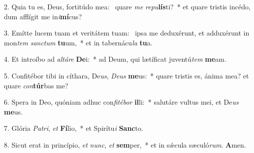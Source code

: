2. Quia tu es, Deus, fortitúdo mea: \dag\  quare \textit{me} \textit{re}\textit{pu}\textbf{lís}ti?~*  et quare tristis incédo, dum afflígit me in\textit{i}\textbf{mí}cus?\

3. Emítte lucem tuam et veritátem tuam: \dag\  ipsa me deduxérunt, et adduxérunt in mon\textit{tem} \textit{sanc}\textit{tum} \textbf{tu}um,~*  et in tabernácu\textit{la} \textbf{tu}a.\

4. Et introíbo ad \textit{al}\textit{tá}\textit{re} \textbf{De}i:~*  ad Deum, qui lætíficat juventú\textit{tem} \textbf{me}am.\

5. Confitébor tibi in cíthara, De\textit{us}, \textit{De}\textit{us} \textbf{me}us:~*  quare tristis es, ánima mea? et quare \textit{con}\textbf{túr}bas me?\

6. Spera in Deo, quóniam adhuc con\textit{fi}\textit{té}\textit{bor} \textbf{il}li:~*  salutáre vultus mei, et De\textit{us} \textbf{me}us.\

7. Glória \textit{Pa}\textit{tri}, \textit{et} \textbf{Fí}lio,~*  et Spirítu\textit{i} \textbf{Sanc}to.\

8. Sicut erat in princípio, \textit{et} \textit{nunc}, \textit{et} \textbf{sem}per,~*  et in sǽcula sæculó\textit{rum}. \textbf{A}men.\


